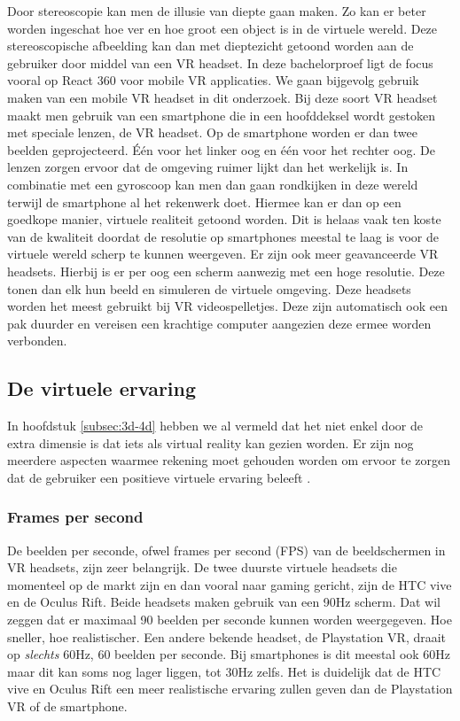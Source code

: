 Door stereoscopie kan men de illusie van diepte gaan maken. Zo kan er beter worden ingeschat hoe ver en hoe groot een object is in de virtuele wereld. Deze stereoscopische afbeelding kan dan met dieptezicht getoond worden aan de gebruiker door middel van een VR headset. In deze bachelorproef ligt de focus vooral op React 360 voor mobile VR applicaties. We gaan bijgevolg gebruik maken van een mobile VR headset in dit onderzoek. Bij deze soort VR headset maakt men gebruik van een smartphone die in een hoofddeksel wordt gestoken met speciale lenzen, de VR headset. Op de smartphone worden er dan twee beelden geprojecteerd. Één voor het linker oog en één voor het rechter oog. De lenzen zorgen ervoor dat de omgeving ruimer lijkt dan het werkelijk is. In combinatie met een gyroscoop kan men dan gaan rondkijken in deze wereld terwijl de smartphone al het rekenwerk doet. Hiermee kan er dan op een goedkope manier, virtuele realiteit getoond worden. Dit is helaas vaak ten koste van de kwaliteit doordat de resolutie op smartphones meestal te laag is voor de virtuele wereld scherp te kunnen weergeven. Er zijn ook meer geavanceerde VR headsets. Hierbij is er per oog een scherm aanwezig met een hoge resolutie. Deze tonen dan elk hun beeld en simuleren de virtuele omgeving. Deze headsets worden het meest gebruikt bij VR videospelletjes. Deze zijn automatisch ook een pak duurder en vereisen een krachtige computer aangezien deze ermee worden verbonden.

\subsection{De virtuele ervaring}
\label{subsec:vr-ervaring}
In hoofdstuk \ref{subsec:3d-4d} hebben we al vermeld dat het niet enkel door de extra dimensie is dat iets als virtual reality kan gezien worden. Er zijn nog meerdere aspecten waarmee rekening moet gehouden worden om ervoor te zorgen dat de gebruiker een positieve virtuele ervaring beleeft \autocite{Mullis2016}.

\subsubsection{Frames per second}
\label{ssubsec:fps}
De beelden per seconde, ofwel frames per second (FPS) van de beeldschermen in VR headsets, zijn zeer belangrijk. De twee duurste virtuele headsets die momenteel op de markt zijn en dan vooral naar gaming gericht, zijn de HTC vive en de Oculus Rift. Beide headsets maken gebruik van een 90Hz scherm. Dat wil zeggen dat er maximaal 90 beelden per seconde kunnen worden weergegeven. Hoe sneller, hoe realistischer. Een andere bekende headset, de Playstation VR, draait op \textit{slechts} 60Hz, 60 beelden per seconde. Bij smartphones is dit meestal ook 60Hz maar dit kan soms nog lager liggen, tot 30Hz zelfs. Het is duidelijk dat de HTC vive en Oculus Rift een meer realistische ervaring zullen geven dan de Playstation VR of de smartphone.


